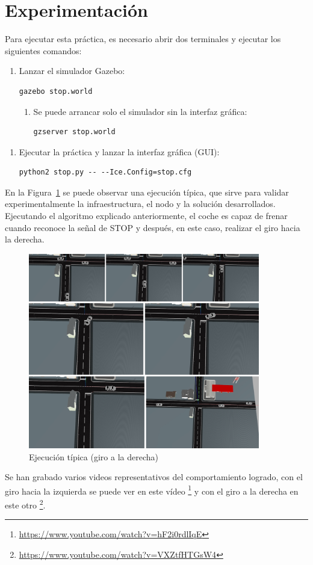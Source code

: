 \section{Experimentación}
 
Para ejecutar esta práctica, es necesario abrir dos terminales y ejecutar los siguientes comandos:

\begin{enumerate}[1.]
\item Lanzar el simulador Gazebo:
	\begin{lstlisting}[frame=single]
		gazebo stop.world
	\end{lstlisting} 
	\begin{enumerate}[1b.]
	\item Se puede arrancar solo el simulador sin la interfaz gráfica:
		\begin{lstlisting}[frame=single]
		 	gzserver stop.world
		\end{lstlisting}
	\end{enumerate}
\end{enumerate}

\begin{enumerate}[2.]
\item	Ejecutar la práctica y lanzar la interfaz gráfica (GUI): 
	\begin{lstlisting}[frame=single]
		python2 stop.py -- --Ice.Config=stop.cfg
	\end{lstlisting} 
\end{enumerate}

En la Figura~\ref{fig.ejecucionFinal} se puede observar una ejecución típica, que sirve para validar experimentalmente
la infraestructura, el nodo y la solución desarrollados. Ejecutando el algoritmo explicado anteriormente, el coche es capaz de frenar cuando reconoce la señal de STOP y después, en este caso, realizar el giro hacia la derecha. \\

\begin{figure}[H]
  \begin{center}
    \includegraphics[width=0.9\textwidth]{figures/Stop/ejecucionFinal.jpg}
		\caption{Ejecución típica (giro a la derecha)}
		\label{fig.ejecucionFinal}
		\end{center}
\end{figure}


Se han grabado varios videos representativos del comportamiento logrado, con el giro hacia la izquierda se puede ver en este vídeo \footnote{\url{https://www.youtube.com/watch?v=hF2i0rdlIqE}} y con el giro a la derecha en este otro \footnote{\url{https://www.youtube.com/watch?v=VXZtfHTGsW4}}.
